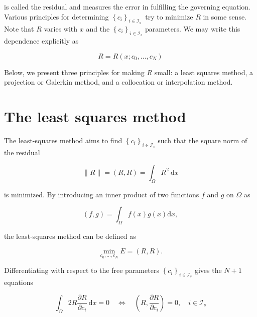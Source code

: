 \documentclass[../main.tex]{subfiles}
\begin{document}
	\noindent is called the residual and measures the error in fulfilling the governing equation.
	Various principles for determining $\left\{c_{i}\right\}_{i \in \mathcal{I}_{\text {s }}}$ try to minimize $R$ in some sense. Note that $R$ varies with $x$ and the $\left\{c_{i}\right\}_{i \in \mathcal{I}_{s}}$ parameters. We may write this dependence explicitly as
	
	\begin{equation}
		\label{eqa133}
		R=R\left(x ; c_{0}, \ldots, c_{N}\right)
	\end{equation}

	\noindent Below, we present three principles for making $R$ small: a least squares method, a projection or Galerkin method, and a collocation or interpolation method.
	
\section[The least squares method]{The least squares method} 
	\label{sec:sec_11_4}

	\noindent The least-squares method aims to find $\left\{c_{i}\right\}_{i \in \mathcal{I}_{s}}$ such that the square norm of the residual
	
	\begin{equation}
		\label{eqa134}
		\|R\|=(R, R)=\int_{\Omega} R^{2} \mathrm{~d} x
	\end{equation}

	\noindent is minimized. By introducing an inner product of two functions $f$ and $g$ on $\Omega$ as
	
	\begin{equation}
		\label{eqa135}
		(f, g)=\int_{\Omega} f(x) g(x) \mathrm{d} x,
	\end{equation}

	\noindent the least-squares method can be defined as
	
	\begin{equation}
		\label{eqa136}
	\min _{c_{0}, \ldots, c_{N}} E=(R, R) .
	\end{equation}

	\noindent Differentiating with respect to the free parameters $\left\{c_{i}\right\}_{i \in \mathcal{I}_{s}}$ gives the $N+1$ equations

	\begin{equation}
		\label{eqa137}
		\int_{\Omega} 2 R \frac{\partial R}{\partial c_{i}} \mathrm{~d} x=0 \quad \Leftrightarrow \quad\left(R, \frac{\partial R}{\partial c_{i}}\right)=0, \quad i \in \mathcal{I}_{s}
	\end{equation}
\end{document}
